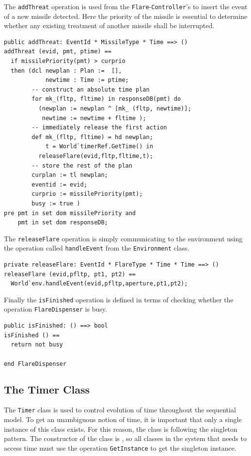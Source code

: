 \documentclass{overturerepchap}
\begin{document}
The \texttt{addThreat} operation is used from the
\texttt{Flare}-\texttt{Controller}'s  
to insert the event of a new missile detected. Here the priority of the
missile is essential to determine whether any existing treatment of another
missile shall be interrupted.

\begin{lstlisting}
public addThreat: EventId * MissileType * Time ==> ()
addThreat (evid, pmt, ptime) ==
  if missilePriority(pmt) > curprio
  then (dcl newplan : Plan :=  [],
            newtime : Time := ptime;
        -- construct an absolute time plan
        for mk_(fltp, fltime) in responseDB(pmt) do
          (newplan := newplan ^ [mk_ (fltp, newtime)];
           newtime := newtime + fltime );
        -- immediately release the first action
        def mk_(fltp, fltime) = hd newplan;
            t = World`timerRef.GetTime() in
          releaseFlare(evid,fltp,fltime,t);
        -- store the rest of the plan
        curplan := tl newplan;
        eventid := evid;
        curprio := missilePriority(pmt);
        busy := true )
pre pmt in set dom missilePriority and
    pmt in set dom responseDB;
\end{lstlisting}

The \texttt{releaseFlare} operation is simply communicating to the 
environment using the operation called \texttt{handleEvent} from the \texttt{Environment} 
class.

\begin{lstlisting}
private releaseFlare: EventId * FlareType * Time * Time ==> ()
releaseFlare (evid,pfltp, pt1, pt2) == 
  World`env.handleEvent(evid,pfltp,aperture,pt1,pt2);
\end{lstlisting}

Finally the \texttt{isFinished} operation is defined in terms of checking
whether the operation \texttt{FlareDispenser} is busy.

\begin{lstlisting}
public isFinished: () ==> bool
isFinished () == 
  return not busy

end FlareDispenser
\end{lstlisting}

\subsection{The Timer Class}\label{sec:timerclass}

The \texttt{Timer} class is used to control evolution of time
throughout the sequential model. To get an unambiguous notion of time, it is important that only a single instance of this class exists. For this reason, the class is following the singleton pattern. The constructor of the class is {\bf{}}, so all classes in the system that needs to access time must use the operation \texttt{GetInstance} to get the singleton instance.
\end{document}
